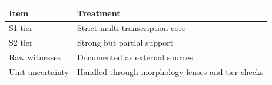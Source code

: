 {\small
\begin{tabular}{ll}
\toprule
Item & Treatment \\
\midrule
S1 tier & Strict multi transcription core \\
S2 tier & Strong but partial support \\
Raw witnesses & Documented as external sources \\
Unit uncertainty & Handled through morphology lenses and tier checks \\
\bottomrule
\end{tabular}
}
